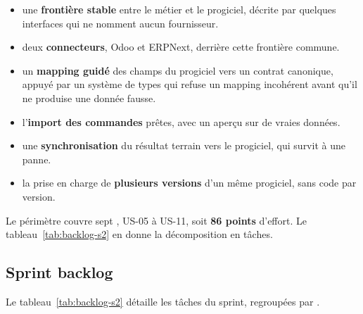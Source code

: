 \begin{itemize}
  \item une \textbf{frontière stable} entre le métier et le progiciel, décrite par quelques
        interfaces qui ne nomment aucun fournisseur.
  \item deux \textbf{connecteurs}, Odoo et ERPNext, derrière cette frontière commune.
  \item un \textbf{mapping guidé} des champs du progiciel vers un contrat canonique, appuyé par un
        système de types qui refuse un mapping incohérent avant qu'il ne produise une donnée fausse.
  \item l'\textbf{import des commandes} prêtes, avec un aperçu sur de vraies données.
  \item une \textbf{synchronisation} du résultat terrain vers le progiciel, qui survit à une panne.
  \item la prise en charge de \textbf{plusieurs versions} d'un même progiciel, sans code par version.
\end{itemize}

Le périmètre couvre sept , US-05 à US-11, soit \textbf{86 points} d'effort. Le
tableau~\ref{tab:backlog-s2} en donne la décomposition en tâches.

\subsection{Sprint backlog}

Le tableau~\ref{tab:backlog-s2} détaille les tâches du sprint, regroupées par .

